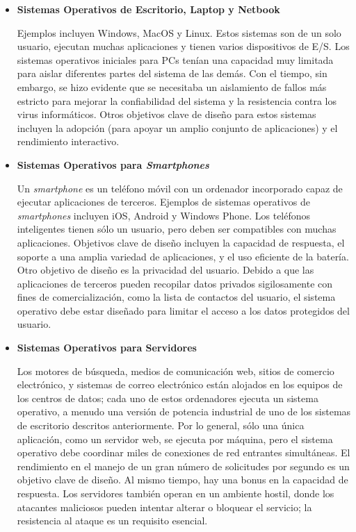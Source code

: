 \documentclass[10pt]{book}
\begin{document}
\begin{itemize}
\item \textbf{Sistemas Operativos de Escritorio, Laptop y Netbook}

Ejemplos incluyen Windows, MacOS y Linux. Estos sistemas son de un solo usuario, ejecutan muchas aplicaciones y tienen varios dispositivos de E/S. Los sistemas operativos iniciales para PCs tenían una capacidad muy limitada para aislar diferentes partes del sistema de las demás. Con el tiempo, sin embargo, se hizo evidente que se necesitaba un aislamiento de fallos más estricto para mejorar la confiabilidad del sistema y la resistencia contra los virus informáticos. Otros objetivos clave de diseño para estos sistemas incluyen la adopción (para apoyar un amplio conjunto de aplicaciones) y el rendimiento interactivo.

\item \textbf{Sistemas Operativos para \textit{Smartphones}}

Un \textit{smartphone} es un teléfono móvil con un ordenador incorporado capaz de ejecutar aplicaciones de terceros. Ejemplos de sistemas operativos de \textit{smartphones} incluyen iOS, Android y Windows Phone. Los teléfonos inteligentes tienen sólo un usuario, pero deben ser compatibles con muchas aplicaciones. Objetivos clave de diseño incluyen la capacidad de respuesta, el soporte a una amplia variedad de aplicaciones, y el uso eficiente de la batería. Otro objetivo de diseño es la privacidad del usuario. Debido a que las aplicaciones de terceros pueden recopilar datos privados sigilosamente con fines de comercialización, como la lista de contactos del usuario, el sistema operativo debe estar diseñado para limitar el acceso a los datos protegidos del usuario.

\item \textbf{Sistemas Operativos para Servidores}

Los motores de búsqueda, medios de comunicación web, sitios de comercio electrónico, y sistemas de correo electrónico están alojados en los equipos de los centros de datos; cada uno de estos ordenadores ejecuta un sistema operativo, a menudo una versión de potencia industrial de uno de los sistemas de escritorio descritos anteriormente. Por lo general, sólo una única aplicación, como un servidor web, se ejecuta por máquina, pero el sistema operativo debe coordinar miles de conexiones de red entrantes simultáneas. El rendimiento en el manejo de un gran número de solicitudes por segundo es un objetivo clave de diseño. Al mismo tiempo, hay una bonus en la capacidad de respuesta. Los servidores también operan en un ambiente hostil, donde los atacantes maliciosos pueden intentar alterar o bloquear el servicio; la resistencia al ataque es un requisito esencial.


\end{itemize}
\end{document}
